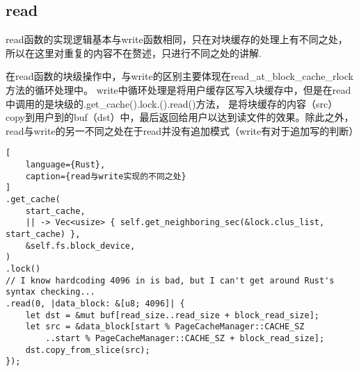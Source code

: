 \subsection{read}
read函数的实现逻辑基本与write函数相同，只在对块缓存的处理上有不同之处，所以在这里对重复的内容不在赘述，只进行不同之处的讲解.

在read函数的块级操作中，与write的区别主要体现在read_at_block_cache_rlock方法的循环处理中。
write中循环处理是将用户缓存区写入块缓存中，但是在read中调用的是块级的.get_cache().lock.().read()方法，
是将块缓存的内容（src）copy到用户到的buf（dst）中，最后返回给用户以达到读文件的效果。除此之外，read与write的另一不同之处在于read并没有追加模式（write有对于追加写的判断）

\begin{lstlisting}[
    language={Rust},
    caption={read与write实现的不同之处}
]
.get_cache(
    start_cache,
    || -> Vec<usize> { self.get_neighboring_sec(&lock.clus_list, start_cache) },
    &self.fs.block_device,
)
.lock()
// I know hardcoding 4096 in is bad, but I can't get around Rust's syntax checking...
.read(0, |data_block: &[u8; 4096]| {
    let dst = &mut buf[read_size..read_size + block_read_size];
    let src = &data_block[start % PageCacheManager::CACHE_SZ
        ..start % PageCacheManager::CACHE_SZ + block_read_size];
    dst.copy_from_slice(src);
});
\end{lstlisting}

